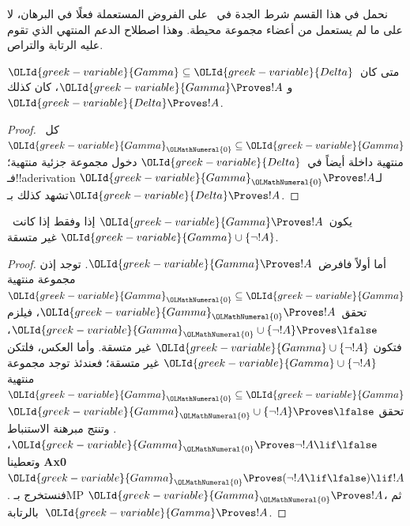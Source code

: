 \documentclass[../../../include/open-logic-section]{subfiles}
\begin{document}
      {}
      {}


\begin{editorial}
نحمل في هذا القسم شرط الجدة في~\QR{} على الفروض المستعملة فعلًا في البرهان،
لا على ما لم يستعمل من أعضاء مجموعة محيطة. وهذا اصطلاح الدعم المنتهي الذي
تقوم عليه الرتابة والتراص.
\end{editorial}

\begin{prop}[الرتابة] متى كان~$\OLId{greek-variable}{Gamma} \subseteq \OLId{greek-variable}{Delta}$ و
$\OLId{greek-variable}{Gamma} \Proves !A$، كان كذلك~$\OLId{greek-variable}{Delta} \Proves !A$.
\end{prop}

\begin{proof}
كل~$\OLId{greek-variable}{Gamma}_\OLMathNumeral{0} \subseteq \OLId{greek-variable}{Gamma}$ منتهية داخلة أيضاً في~$\OLId{greek-variable}{Delta}$ دخول
مجموعة جزئية منتهية؛ فـ!!a{derivation} لـ$\OLId{greek-variable}{Gamma}_\OLMathNumeral{0} \Proves !A$ تشهد
كذلك بـ$\OLId{greek-variable}{Delta} \Proves !A$.
\end{proof}

\begin{prop}
يكون~$\OLId{greek-variable}{Gamma} \Proves !A$ إذا وفقط إذا كانت~$\OLId{greek-variable}{Gamma}\cup \{\lnot!A \}$
غير متسقة.
\end{prop}

\begin{proof}
أما أولاً فافرض~$\OLId{greek-variable}{Gamma} \Proves !A$. توجد إذن مجموعة منتهية
$\OLId{greek-variable}{Gamma}_\OLMathNumeral{0} \subseteq \OLId{greek-variable}{Gamma}$ تحقق~$\OLId{greek-variable}{Gamma}_\OLMathNumeral{0} \Proves !A$، فيلزم
$\OLId{greek-variable}{Gamma}_\OLMathNumeral{0} \cup \{\lnot !A\} \Proves \lfalse$، فتكون
$\OLId{greek-variable}{Gamma} \cup \{\lnot !A\}$ غير متسقة. وأما العكس، فلتكن
$\OLId{greek-variable}{Gamma} \cup \{\lnot !A\}$ غير متسقة؛ فعندئذ توجد مجموعة منتهية
$\OLId{greek-variable}{Gamma}_\OLMathNumeral{0} \subseteq \OLId{greek-variable}{Gamma}$ تحقق
$\OLId{greek-variable}{Gamma}_\OLMathNumeral{0} \cup \{\lnot !A\} \Proves \lfalse$. وتنتج مبرهنة الاستنباط
$\OLId{greek-variable}{Gamma}_\OLMathNumeral{0} \Proves \lnot !A \lif \lfalse$، وتعطينا \textbf{Ax0}
$\OLId{greek-variable}{Gamma}_\OLMathNumeral{0} \Proves (\lnot !A \lif \lfalse) \lif !A$. فنستخرج بـMP
$\OLId{greek-variable}{Gamma}_\OLMathNumeral{0} \Proves !A$، ثم بالرتابة~$\OLId{greek-variable}{Gamma} \Proves !A$.
\end{proof}
\end{document}
